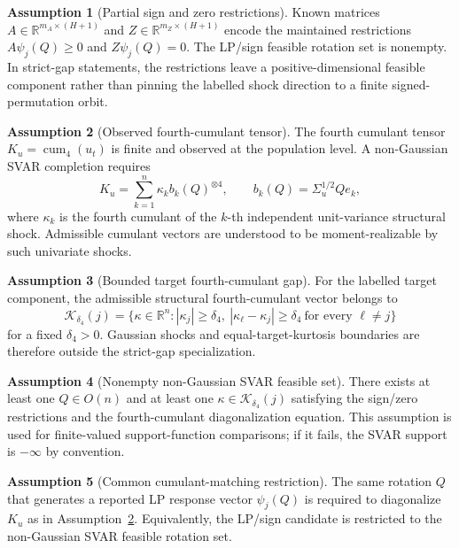 \documentclass[11pt]{article}
\newcommand{\R}{\mathbb{R}}
\theoremstyle{definition}
\newtheorem{assumption}{Assumption}
\theoremstyle{plain}
\theoremstyle{remark}
\begin{document}
\begin{assumption}[Partial sign and zero restrictions]\label{ass:sign-zero}
Known matrices \(A\in\R^{m_A\times(H+1)}\) and
\(Z\in\R^{m_Z\times(H+1)}\) encode the maintained restrictions
\(A\psi_j(Q)\ge0\) and \(Z\psi_j(Q)=0\).  The LP/sign feasible rotation set is
nonempty.  In strict-gap statements, the restrictions leave a
positive-dimensional feasible component rather than pinning the labelled shock
direction to a finite signed-permutation orbit.
\end{assumption}

\begin{assumption}[Observed fourth-cumulant tensor]\label{ass:cumulant-tensor}
The fourth cumulant tensor \(K_u=\operatorname{cum}_4(u_t)\) is finite and
observed at the population level.  A non-Gaussian SVAR completion requires
\[
K_u=\sum_{k=1}^n\kappa_k b_k(Q)^{\otimes4},
\qquad b_k(Q)=\Sigma_u^{1/2}Qe_k,
\]
where \(\kappa_k\) is the fourth cumulant of the \(k\)-th independent
unit-variance structural shock.  Admissible cumulant vectors are understood to
be moment-realizable by such univariate shocks.
\end{assumption}

\begin{assumption}[Bounded target fourth-cumulant gap]\label{ass:bounded-gap}
For the labelled target component, the admissible structural fourth-cumulant
vector belongs to
\[
\mathcal K_{\delta_4}(j)=
\{\kappa\in\R^n:|\kappa_j|\ge\delta_4,\ 
|\kappa_\ell-\kappa_j|\ge\delta_4\ \text{for every }\ell\ne j\}
\]
for a fixed \(\delta_4>0\).  Gaussian shocks and equal-target-kurtosis
boundaries are therefore outside the strict-gap specialization.
\end{assumption}

\begin{assumption}[Nonempty non-Gaussian SVAR feasible set]\label{ass:svar-nonempty}
There exists at least one \(Q\in O(n)\) and at least one
\(\kappa\in\mathcal K_{\delta_4}(j)\) satisfying the sign/zero restrictions
and the fourth-cumulant diagonalization equation.  This assumption is used for
finite-valued support-function comparisons; if it fails, the SVAR support is
\(-\infty\) by convention.
\end{assumption}

\begin{assumption}[Common cumulant-matching restriction]\label{ass:cumulant-matching}
The same rotation \(Q\) that generates a reported LP response vector
\(\psi_j(Q)\) is required to diagonalize \(K_u\) as in
Assumption~\ref{ass:cumulant-tensor}.  Equivalently, the LP/sign candidate is
restricted to the non-Gaussian SVAR feasible rotation set.
\end{assumption}
\end{document}
